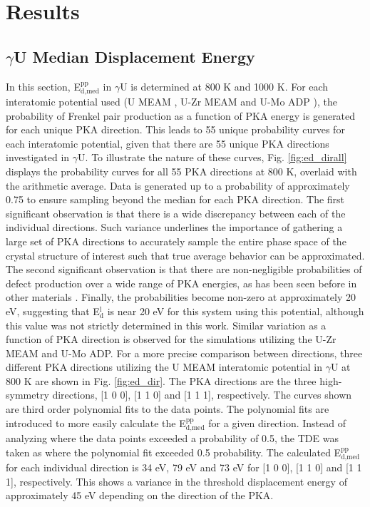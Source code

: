 \documentclass[review]{elsarticle}
\begin{document}
\FloatBarrier

\section{Results}
\subsection{$\gamma$U Median Displacement Energy}

In this section, E$^{\textrm{pp}}_{\textrm{d,med}}$ in $\gamma$U is determined at 800 K and 1000 K. For each interatomic potential used (U MEAM \cite{beeler_meam}, U-Zr MEAM \cite{moore2015} and U-Mo ADP \cite{smirnovaADP}), the probability of Frenkel pair production as a function of PKA energy is generated for each unique PKA direction. This leads to 55 unique probability curves for each interatomic potential, given that there are 55 unique PKA directions investigated in $\gamma$U. To illustrate the nature of these curves, Fig. \ref{fig:ed_dirall} displays the probability curves for all 55 PKA directions at 800 K, overlaid with the arithmetic average. Data is generated up to a probability of approximately 0.75 to ensure sampling beyond the median for each PKA direction. The first significant observation is that there is a wide discrepancy between each of the individual directions. Such variance underlines the importance of gathering a large set of PKA directions to accurately sample the entire phase space of the crystal structure of interest such that true average behavior can be approximated. The second significant observation is that there are non-negligible probabilities of defect production over a wide range of PKA energies, as has been seen before in other materials \cite{beeler2016, nordlund2006, zepeda-ruiz2003, tsuchihira2013}. Finally, the probabilities become non-zero at approximately 20 eV, suggesting that E$^{\textrm{l}}_{\textrm{d}}$ is near 20 eV for this system using this potential, although this value was not strictly determined in this work. Similar variation as a function of PKA direction is observed for the simulations utilizing the U-Zr MEAM and U-Mo ADP. For a more precise comparison between directions, three different PKA directions utilizing the U MEAM interatomic potential in $\gamma$U at 800 K are shown in Fig. \ref{fig:ed_dir}. The PKA directions are the three high-symmetry directions, [1 0 0], [1 1 0] and [1 1 1], respectively. The curves shown are third order polynomial fits to the data points. The polynomial fits are introduced to more easily calculate the E$^{\textrm{pp}}_{\textrm{d,med}}$ for a given direction. Instead of analyzing where the data points exceeded a probability of 0.5, the TDE was taken as where the polynomial fit exceeded 0.5 probability. The calculated E$^{\textrm{pp}}_{\textrm{d,med}}$ for each individual direction is 34 eV, 79 eV and 73 eV for [1 0 0], [1 1 0] and [1 1 1], respectively. This shows a variance in the threshold displacement energy of approximately 45 eV depending on the direction of the PKA. 
\end{document}
